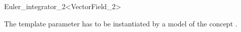 
\begin{ccRefFunctionObjectClass}{Euler_integrator_2<VectorField_2>}  %

\ccDefinition

The template parameter  has to
be instantiated by a model of the concept .


\ccIsModel 

 \\


\ccSeeAlso
{} \\
\end{ccRefFunctionObjectClass}


